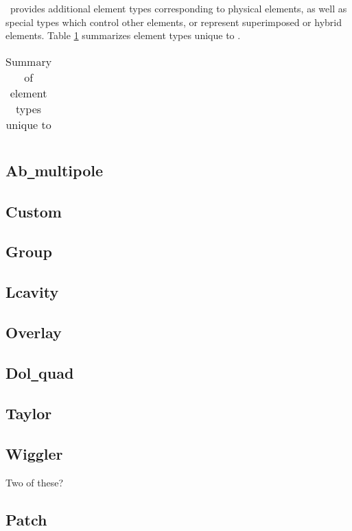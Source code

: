 \bmad\ provides additional element types corresponding to physical elements, as well as special
types which control other elements, or represent superimposed or hybrid elements.
Table \ref{tab:bmad_elements} summarizes element types unique to \bmad.

\begin{table}\label{tab:bmad_elements}\center
{\tt\begin{tabular}{|l|l|} \hline

\end{tabular}}
\caption{Summary of element types unique to \bmad}
\end{table}
\subsection{Ab{\tt\_}multipole}
\subsection{Custom}
\subsection{Group}
\subsection{Lcavity}
\subsection{Overlay}
\subsection{Dol{\tt\_}quad}
\subsection{Taylor}
\subsection{Wiggler} Two of these?
\subsection{Patch}

